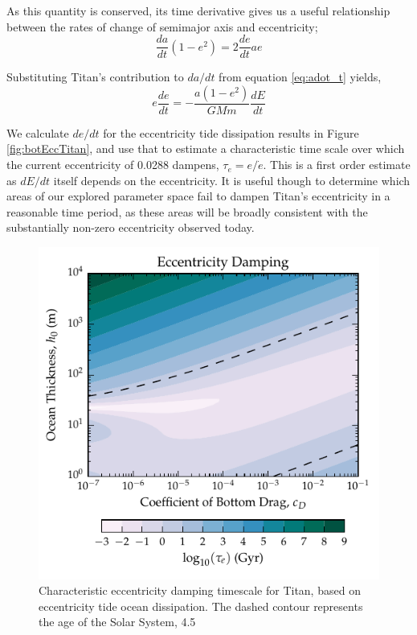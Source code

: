 As this quantity is conserved, its time derivative gives us a useful relationship between the rates of change of semimajor axis and eccentricity;
\begin{equation}\label{eq:adot_edot}
\dfrac{da}{dt}(1-e^2) = 2 \dfrac{de}{dt}ae
\end{equation}

Substituting Titan's contribution to $da/dt$ from equation \ref{eq:adot_t} yields,
\begin{equation}\label{eq:adot_edot}
e\dfrac{de}{dt} = - \dfrac{a (1-e^2)}{GMm} \dfrac{dE}{dt}
\end{equation}

We calculate $de/dt$ for the eccentricity tide dissipation results in Figure \ref{fig:botEccTitan}, and use that to estimate a characteristic time scale over which the current eccentricity of 0.0288 dampens, $\tau_e = e/\dot{e}$. This is a first order estimate as $dE/dt$ itself depends on the eccentricity. It is useful though to determine which areas of our explored parameter space fail to dampen Titan's eccentricity in a reasonable time period, as these areas will be broadly consistent with the substantially non-zero eccentricity observed today.

\begin{figure}[!b]
\centering
\includegraphics[width=0.95\linewidth]{Figures/eccentricity}
\caption{Characteristic eccentricity damping timescale for Titan, based on eccentricity tide ocean dissipation. The dashed contour represents the age of the Solar System, \SI{4.5}{\giga\year} \label{fig:edotTitan}}
\end{figure}

